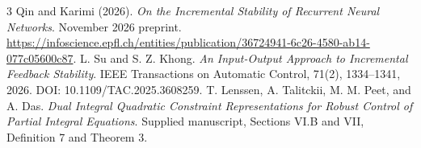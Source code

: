 \documentclass[final,5p,twocolumn]{elsarticle}
\theoremstyle{definition}
\theoremstyle{remark}
\begin{document}
\begin{thebibliography}{3}
Qin and Karimi (2026). \emph{On the Incremental Stability of Recurrent Neural Networks}. November 2026 preprint. \url{https://infoscience.epfl.ch/entities/publication/36724941-6c26-4580-ab14-077c05600c87}.
L. Su and S. Z. Khong. \emph{An Input-Output Approach to Incremental Feedback Stability}. IEEE Transactions on Automatic Control, 71(2), 1334--1341, 2026. DOI: 10.1109/TAC.2025.3608259.
T. Lenssen, A. Talitckii, M. M. Peet, and A. Das. \emph{Dual Integral Quadratic Constraint Representations for Robust Control of Partial Integral Equations}. Supplied manuscript, Sections VI.B and VII, Definition 7 and Theorem 3.
\end{thebibliography}
\end{document}
